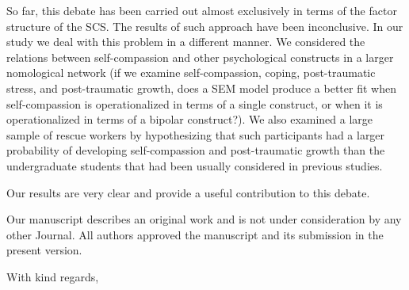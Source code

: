 \documentclass[a4paper]{letter} %
\begin{document}
\begin{letter}
So far, this debate has been carried out almost exclusively in terms of the factor structure of the SCS.  The results of such approach have been inconclusive. In our study we deal with this problem in a different manner. We considered the relations between self-compassion and other psychological constructs in a larger nomological network (if we examine self-compassion, coping, post-traumatic stress, and post-traumatic growth, does a SEM model produce a better fit when self-compassion is operationalized in terms of a single construct, or when it is operationalized in terms of a bipolar construct?). We also examined a large sample of rescue workers by hypothesizing that such participants had a larger probability of developing self-compassion and post-traumatic growth than the undergraduate students that had been usually considered in previous studies.

Our results are very clear and provide a useful contribution to this debate.

Our manuscript describes an original work and is not under consideration by any other Journal. 
All authors approved the manuscript and its submission in the present version.    


\bigskip
\bigskip

\closing{With kind regards,}





\end{letter}
\end{document}
